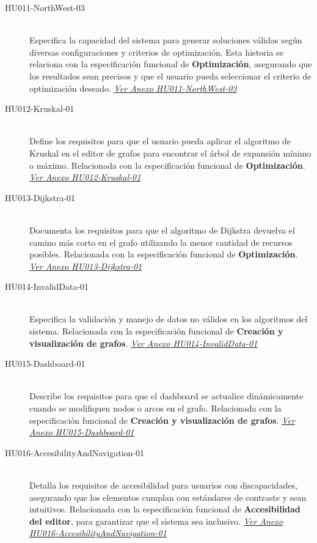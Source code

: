 \documentclass[stu, 12pt, letterpaper, donotrepeattitle, floatsintext, natbib]{apa7}
\begin{document}
\begin{description}
    \item[HU011-NorthWest-03] \hfill \\
    Especifica la capacidad del sistema para generar soluciones válidas según diversas configuraciones y criterios de optimización. Esta historia se relaciona con la especificación funcional de \textbf{Optimización}, asegurando que los resultados sean precisos y que el usuario pueda seleccionar el criterio de optimización deseado. \textit{\hyperref[tab:HU011-NorthWest-03]{Ver Anexo HU011-NorthWest-03}}

    \item[HU012-Kruskal-01] \hfill \\
    Define los requisitos para que el usuario pueda aplicar el algoritmo de Kruskal en el editor de grafos para encontrar el árbol de expansión mínimo o máximo. Relacionada con la especificación funcional de \textbf{Optimización}. \textit{\hyperref[tab:HU012-Kruskal-01]{Ver Anexo HU012-Kruskal-01}}

    \item[HU013-Dijkstra-01] \hfill \\
    Documenta los requisitos para que el algoritmo de Dijkstra devuelva el camino más corto en el grafo utilizando la menor cantidad de recursos posibles. Relacionada con la especificación funcional de \textbf{Optimización}. \textit{\hyperref[tab:HU013-Dijkstra-01]{Ver Anexo HU013-Dijkstra-01}}

    \item[HU014-InvalidData-01] \hfill \\
    Especifica la validación y manejo de datos no válidos en los algoritmos del sistema. Relacionada con la especificación funcional de \textbf{Creación y visualización de grafos}. \textit{\hyperref[tab:HU014-InvalidData-01]{Ver Anexo HU014-InvalidData-01}}

    \item[HU015-Dashboard-01] \hfill \\
    Describe los requisitos para que el dashboard se actualice dinámicamente cuando se modifiquen nodos o arcos en el grafo. Relacionada con la especificación funcional de \textbf{Creación y visualización de grafos}. \textit{\hyperref[tab:HU015-Dashboard-01]{Ver Anexo HU015-Dashboard-01}}

    \item[HU016-AccesibilityAndNavigation-01] \hfill \\
    Detalla los requisitos de accesibilidad para usuarios con discapacidades, asegurando que los elementos cumplan con estándares de contraste y sean intuitivos. Relacionada con la especificación funcional de \textbf{Accesibilidad del editor}, para garantizar que el sistema sea inclusivo. \textit{\hyperref[tab:HU016-AccesibilityAndNavigation-01]{Ver Anexo HU016-AccesibilityAndNavigation-01}}
    

\end{description}
\end{document}
